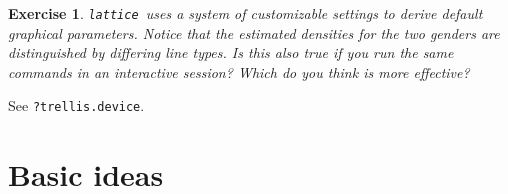\documentclass[10pt]{article}
\newcommand{\code}[1]{\texttt{#1}}
\newcommand{\lattice}{\code{lattice}}
\newtheorem{exercise}{Exercise}
\newenvironment{solution}{}{}
\begin{document}
\begin{exercise}
  \lattice\ uses a system of customizable settings to derive default
  graphical parameters.  Notice that the estimated densities for the
  two genders are distinguished by differing line types.  Is this also
  true if you run the same commands in an interactive session?  Which
  do you think is more effective?
\end{exercise}

\begin{solution}
  See \code{?trellis.device}.
\end{solution}



\newpage

\section*{Basic ideas}
\end{document}

